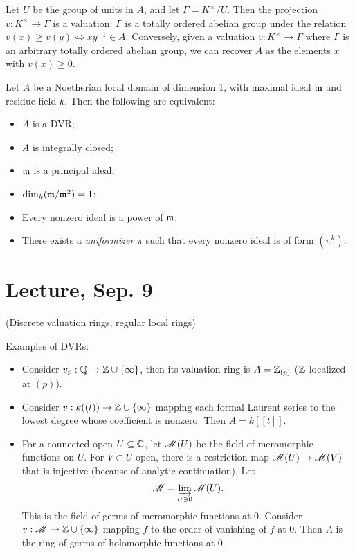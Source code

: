 \documentclass[11pt]{amsart}
\begin{document}
Let $U$ be the group of units in $A$, and let $\Gamma = K^{\times}/U$. Then the projection $v: K^{\times} \to \Gamma$ is a valuation: $\Gamma$ is a totally ordered abelian group under the relation $v(x) \ge v(y) \iff xy^{-1} \in A$. Conversely, given a valuation $v: K^{\times} \to \Gamma$ where $\Gamma$ is an arbitrary totally ordered abelian group, we can recover $A$ as the elements $x$ with $v(x) \ge 0$.

\begin{prop}
Let $A$ be a Noetherian local domain of dimension 1, with maximal ideal $\mathfrak{m}$ and residue field $k$. Then the following are equivalent:
\begin{itemize}
    \item $A$ is a DVR;
    \item $A$ is integrally closed;
    \item $\mathfrak{m}$ is a principal ideal;
    \item $\dim_k (\mathfrak{m}/\mathfrak{m}^2) = 1$;
    \item Every nonzero ideal is a power of $\mathfrak{m}$;
    \item There exists a \emph{uniformizer} $\pi$ such that every nonzero ideal is of form $(\pi^k)$.
\end{itemize}
\end{prop}


\section{Lecture, Sep. 9}

(Discrete valuation rings, regular local rings)

Examples of DVRs:
\begin{itemize}
    \item Consider $v_p: \mathbb{Q}\to \mathbb{Z} \cup \{\infty\}$, then its valuation ring is $A = \mathbb{Z}_{(p)}$ ($\mathbb{Z}$ localized at $(p)$).
    \item Consider $v: k((t)) \to \mathbb{Z}\cup \{\infty\}$ mapping each formal Laurent series to the lowest degree whose coefficient is nonzero. Then $A = k[[t]]$.
    \item For a connected open $U\subseteq \mathbb{C}$, let $\mathscr{M}(U)$ be the field of meromorphic functions on $U$. For $V\subset U$ open, there is a restriction map $\mathscr{M}(U) \to \mathscr{M}(V)$ that is injective (because of analytic continuation). Let 
    \[\mathscr{M} = \varinjlim_{U\ni 0} \mathscr{M}(U).\]
    This is the field of germs of meromorphic functions at 0. Consider $v: \mathscr{M} \to \mathbb{Z}\cup \{\infty\}$ mapping $f$ to the order of vanishing of $f$ at 0. Then $A$ is the ring of germs of holomorphic functions at 0.
\end{itemize}
\end{document}

